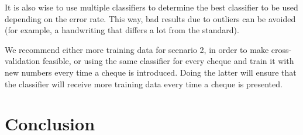 \documentclass[11pt,twoside,a4paper]{article}
\begin{document}
It is also wise to use multiple classifiers to determine the best classifier to be used depending on the error rate. This way, bad results due to outliers can be avoided (for example, a handwriting that differs a lot from the standard).

We recommend either more training data for scenario 2, in order to make cross-validation feasible, or using the same classifier for every cheque and train it with new numbers every time a cheque is introduced. Doing the latter will ensure that the classifier will receive more training data every time a cheque is presented.

\section{Conclusion}

\newpage


\end{document}
